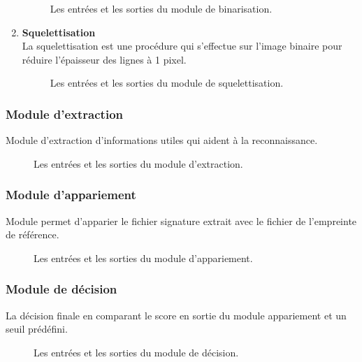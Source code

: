 \begin{enumerate}
		\begin{figure}[H]
			\centering
			
			\caption{Les entrées et les sorties du module de binarisation.}
			\label{binModule}
		\end{figure}
 
	\item\textbf{ Squelettisation}\\
	La squelettisation est une procédure qui s’effectue sur l’image binaire pour réduire l’épaisseur des lignes à 1 pixel.
		\begin{figure}[H]
			\centering
			\caption{Les entrées et les sorties du module de squelettisation.}
			\label{seqModule}
		\end{figure}

\end{enumerate}
\subsubsection{Module d’extraction}
Module d'extraction d'informations utiles qui aident à la reconnaissance.
\begin{figure}[H]
	\centering
	
	\caption{Les entrées et les sorties du module d'extraction.}
	\label{extModule}
\end{figure}

\subsubsection{Module d’appariement}
Module permet d'apparier le fichier signature extrait avec le fichier de l'empreinte de référence.
\begin{figure}[H]
	\centering
	\caption{Les entrées et les sorties du module d'appariement.}
	\label{appModule}
\end{figure}

\subsubsection{Module de décision}
La décision finale en comparant le score en sortie du module appariement et un seuil prédéfini.
\begin{figure}[H]
	\centering
	
	\caption{Les entrées et les sorties du module de décision.}
	\label{decModule}
\end{figure}
